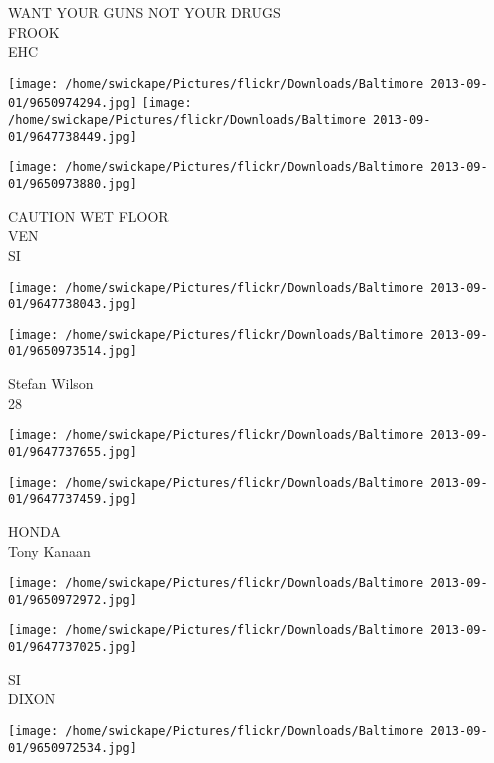 \documentclass[10pt,letterpaper]{article}
\begin{document}
WANT YOUR GUNS NOT YOUR DRUGS\\
FROOK\\
EHC\\
\pagebreak

\texttt{[image: /home/swickape/Pictures/flickr/Downloads/Baltimore 2013-09-01/9650974294.jpg]}
\texttt{[image: /home/swickape/Pictures/flickr/Downloads/Baltimore 2013-09-01/9647738449.jpg]}

\vspace{0.25in}
\texttt{[image: /home/swickape/Pictures/flickr/Downloads/Baltimore 2013-09-01/9650973880.jpg]}

CAUTION WET FLOOR\\
VEN\\
SI\\
\pagebreak

\texttt{[image: /home/swickape/Pictures/flickr/Downloads/Baltimore 2013-09-01/9647738043.jpg]}

\vspace{0.25in}
\texttt{[image: /home/swickape/Pictures/flickr/Downloads/Baltimore 2013-09-01/9650973514.jpg]}

Stefan Wilson\\
28\\
\pagebreak

\texttt{[image: /home/swickape/Pictures/flickr/Downloads/Baltimore 2013-09-01/9647737655.jpg]}

\vspace{0.25in}
\texttt{[image: /home/swickape/Pictures/flickr/Downloads/Baltimore 2013-09-01/9647737459.jpg]}

HONDA\\
Tony Kanaan\\
\pagebreak

\texttt{[image: /home/swickape/Pictures/flickr/Downloads/Baltimore 2013-09-01/9650972972.jpg]}

\vspace{0.25in}
\texttt{[image: /home/swickape/Pictures/flickr/Downloads/Baltimore 2013-09-01/9647737025.jpg]}

SI\\
DIXON\\
\pagebreak

\texttt{[image: /home/swickape/Pictures/flickr/Downloads/Baltimore 2013-09-01/9650972534.jpg]}
\end{document}
